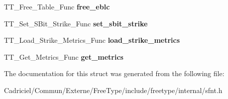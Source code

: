 \begin{DoxyCompactItemize}
\item 
\hypertarget{struct_s_f_n_t___interface___a043a22a8dd45b30dc6e8e5cb7be8dc44}{T\-T\-\_\-\-Free\-\_\-\-Table\-\_\-\-Func {\bfseries free\-\_\-eblc}}\label{struct_s_f_n_t___interface___a043a22a8dd45b30dc6e8e5cb7be8dc44}

\item 
\hypertarget{struct_s_f_n_t___interface___ab9e73d79753ea4a492c1cf66aee8e518}{T\-T\-\_\-\-Set\-\_\-\-S\-Bit\-\_\-\-Strike\-\_\-\-Func {\bfseries set\-\_\-sbit\-\_\-strike}}\label{struct_s_f_n_t___interface___ab9e73d79753ea4a492c1cf66aee8e518}

\item 
\hypertarget{struct_s_f_n_t___interface___a285149d0d4f00f2b862e3db45205cfa0}{T\-T\-\_\-\-Load\-\_\-\-Strike\-\_\-\-Metrics\-\_\-\-Func {\bfseries load\-\_\-strike\-\_\-metrics}}\label{struct_s_f_n_t___interface___a285149d0d4f00f2b862e3db45205cfa0}

\item 
\hypertarget{struct_s_f_n_t___interface___a32ceff5842782c1cf7d7992e40cc858e}{T\-T\-\_\-\-Get\-\_\-\-Metrics\-\_\-\-Func {\bfseries get\-\_\-metrics}}\label{struct_s_f_n_t___interface___a32ceff5842782c1cf7d7992e40cc858e}

\end{DoxyCompactItemize}


The documentation for this struct was generated from the following file\-:\begin{DoxyCompactItemize}
\item 
Cadriciel/\-Commun/\-Externe/\-Free\-Type/include/freetype/internal/sfnt.\-h\end{DoxyCompactItemize}
